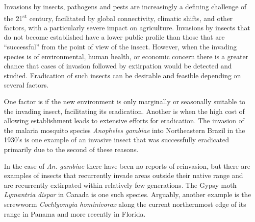 \documentclass[10pt,a4paper,twocolumn]{article}
\begin{document}
Invasions by insects, pathogens and pests are increasingly a 
defining challenge of the 21\textsuperscript{st} century, 
facilitated by global connectivity, climatic shifts, and
other factors\cite{simberloff_impacts_2013,Pimentel2007}, with a particularly 
severe impact on agriculture\cite{paini2016global}.
Invasions by insects that do not become established have a lower public profile
than those that are ``successful'' from the point of view of the insect.
However, when the invading species is of environmental, human health, or 
economic concern there is a greater chance that cases of invasion followed 
by extirpation would be detected 
and studied\cite{liebhold_population_2008}.
Eradication of such insects can be desirable and 
feasible\cite{myers_eradication_2000} depending on several factors.

One factor is if the new environment is only marginally or 
seasonally suitable to the invading insect, facilitating its eradication.
Another is when the high cost of allowing establishment leads
to extensive efforts for eradication.
The invasion of the malaria mosquito species \textit{Anopheles gambiae}
into Northeastern Brazil in the 1930's\cite{soper_emphanopheles_1943}
is one example of an invasive insect that was successfully eradicated 
primarily due to the second of these
reasons\cite{causey_ecology_1943,killeen_eradication_2002}.

In the case of \textit{An. gambiae} there have been no reports of
reinvasion, but there are examples of insects that
recurrently invade areas outside their native range and are recurrently
extirpated within relatively few generations.
The Gypsy moth \textit{Lymantria dispar} in Canada\cite{gray_hitchhikers_2010} 
is one such species.
Arguably, another example is 
the screwworm \textit{Cochlyomyia hominivorax} along 
the current northernmost edge of its range in 
Panama\cite{robinson_enabling_2009}
and more recently in Florida\cite{matthews2017news}.
\end{document}
